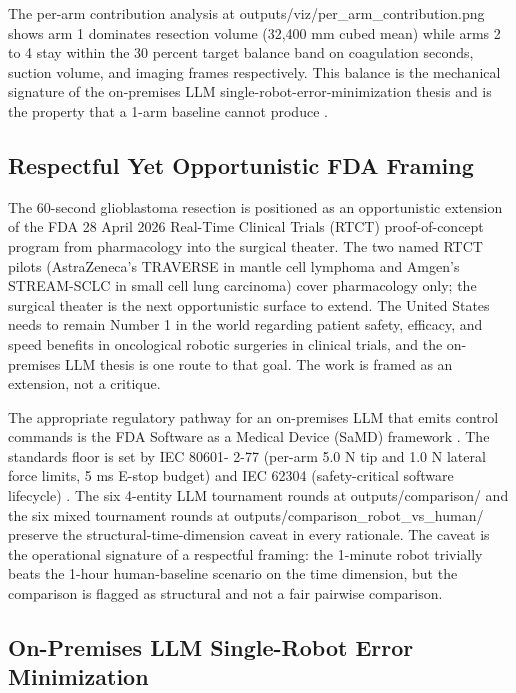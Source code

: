 The per-arm contribution analysis at
outputs/viz/per_arm_contribution.png shows arm 1 dominates resection
volume (32,400 mm cubed mean) while arms 2 to 4 stay within the 30
percent target balance band on coagulation seconds, suction volume,
and imaging frames respectively. This balance is the mechanical
signature of the on-premises LLM single-robot-error-minimization
thesis and is the property that a 1-arm baseline cannot produce
\cite{rosa-one-brain, Lefranc2014ROSAStereotaxy, kawchak_2026_19994945,
repo-robotic-surgeries}.

\subsection{Respectful Yet Opportunistic FDA Framing}
\label{sec:discussion-fda}

The 60-second glioblastoma resection is positioned as an
opportunistic extension of the FDA 28 April 2026 Real-Time Clinical
Trials (RTCT) proof-of-concept program \cite{fda2026realtime} from
pharmacology into the surgical theater. The two named RTCT pilots
(AstraZeneca's TRAVERSE in mantle cell lymphoma and Amgen's
STREAM-SCLC in small cell lung carcinoma) cover pharmacology only;
the surgical theater is the next opportunistic surface to extend.
The United States needs to remain Number 1 in the world regarding
patient safety, efficacy, and speed benefits in oncological robotic
surgeries in clinical trials, and the on-premises LLM thesis is one
route to that goal. The work is framed as an extension, not a
critique.

The appropriate regulatory pathway for an on-premises LLM that emits
control commands is the FDA Software as a Medical Device (SaMD)
framework \cite{fda-samd}. The standards floor is set by IEC 80601-
2-77 (per-arm 5.0 N tip and 1.0 N lateral force limits, 5 ms E-stop
budget) \cite{iec-80601-2-77} and IEC 62304 (safety-critical
software lifecycle) \cite{iec-62304}. The six 4-entity LLM
tournament rounds at outputs/comparison/ and the six mixed
tournament rounds at outputs/comparison_robot_vs_human/ preserve the
structural-time-dimension caveat in every rationale. The caveat is
the operational signature of a respectful framing: the 1-minute
robot trivially beats the 1-hour human-baseline scenario on the
time dimension, but the comparison is flagged as structural and
not a fair pairwise comparison.

\subsection{On-Premises LLM Single-Robot Error Minimization}
\label{sec:discussion-llm}

